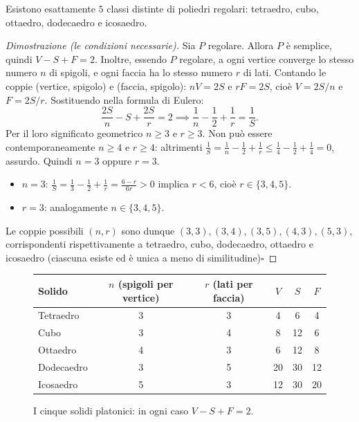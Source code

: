 \begin{teo}
Esistono esattamente $5$ classi distinte di poliedri regolari: tetraedro, cubo, ottaedro, dodecaedro e icosaedro.
\end{teo}
\begin{proof}[Dimostrazione (le condizioni necessarie)]
Sia $P$ regolare. Allora $P$ \`e semplice, quindi $V - S + F = 2$. Inoltre, essendo $P$ regolare, a ogni vertice converge lo stesso numero $n$ di spigoli, e ogni faccia ha lo stesso numero $r$ di lati. Contando le coppie (vertice, spigolo) e (faccia, spigolo): $nV = 2S$ e $rF = 2S$, cio\`e $V = 2S/n$ e $F = 2S/r$. Sostituendo nella formula di Eulero:
\[
\frac{2S}{n} - S + \frac{2S}{r} = 2 \implies \frac1n - \frac12 + \frac1r = \frac1S .
\]
Per il loro significato geometrico $n \geqslant 3$ e $r \geqslant 3$. Non pu\`o essere contemporaneamente $n \geqslant 4$ e $r \geqslant 4$: altrimenti $\frac1S = \frac1n - \frac12 + \frac1r \leqslant \frac14 - \frac12 + \frac14 = 0$, assurdo. Quindi $n = 3$ oppure $r = 3$.
\begin{itemize}
    \item $n = 3$: $\frac1S = \frac13 - \frac12 + \frac1r = \frac{6 - r}{6r} > 0$ implica $r < 6$, cio\`e $r \in \{3, 4, 5\}$.
    \item $r = 3$: analogamente $n \in \{3, 4, 5\}$.
\end{itemize}
Le coppie possibili $(n, r)$ sono dunque $(3,3), (3,4), (3,5), (4,3), (5,3)$, corrispondenti rispettivamente a tetraedro, cubo, dodecaedro, ottaedro e icosaedro (ciascuna esiste ed \`e unica a meno di similitudine)\hfill$\square$
\end{proof}

\begin{figure}[H]
    \centering
    \begin{tabular}{l|c|c|c|c|c}
    \textbf{Solido} & $n$ (spigoli per vertice) & $r$ (lati per faccia) & $V$ & $S$ & $F$ \\ \hline
    Tetraedro & 3 & 3 & 4 & 6 & 4 \\
    Cubo & 3 & 4 & 8 & 12 & 6 \\
    Ottaedro & 4 & 3 & 6 & 12 & 8 \\
    Dodecaedro & 3 & 5 & 20 & 30 & 12 \\
    Icosaedro & 5 & 3 & 12 & 30 & 20 \\
    \end{tabular}
    \caption{I cinque solidi platonici: in ogni caso $V - S + F = 2$.}
\end{figure}


